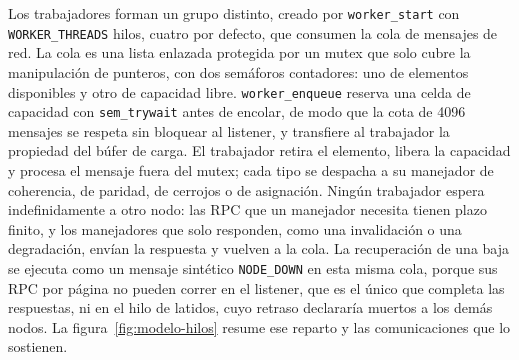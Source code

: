 Los trabajadores forman un grupo distinto, creado por \texttt{worker\_start} con \texttt{WORKER\_THREADS} hilos, cuatro por defecto, que consumen la cola de mensajes de red. La cola es una lista enlazada protegida por un mutex que solo cubre la manipulación de punteros, con dos semáforos contadores: uno de elementos disponibles y otro de capacidad libre. \texttt{worker\_enqueue} reserva una celda de capacidad con \texttt{sem\_trywait} antes de encolar, de modo que la cota de 4096 mensajes se respeta sin bloquear al listener, y transfiere al trabajador la propiedad del búfer de carga. El trabajador retira el elemento, libera la capacidad y procesa el mensaje fuera del mutex; cada tipo se despacha a su manejador de coherencia, de paridad, de cerrojos o de asignación. Ningún trabajador espera indefinidamente a otro nodo: las RPC que un manejador necesita tienen plazo finito, y los manejadores que solo responden, como una invalidación o una degradación, envían la respuesta y vuelven a la cola. La recuperación de una baja se ejecuta como un mensaje sintético \texttt{NODE\_DOWN} en esta misma cola, porque sus RPC por página no pueden correr en el listener, que es el único que completa las respuestas, ni en el hilo de latidos, cuyo retraso declararía muertos a los demás nodos. La figura~\ref{fig:modelo-hilos} resume ese reparto y las comunicaciones que lo sostienen.

